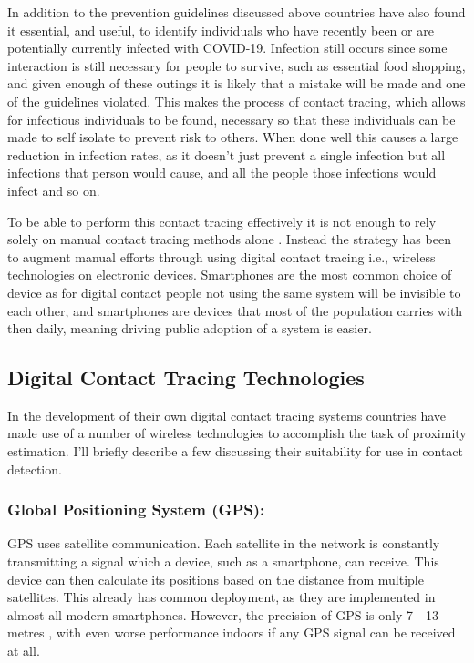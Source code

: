 \documentclass{l4proj}
\begin{document}
In addition to the prevention guidelines discussed above countries have also found it essential, and useful, to identify individuals who have recently been or are potentially currently infected with COVID-19. Infection still occurs since some interaction is still necessary for people to survive, such as essential food shopping, and given enough of these outings it is likely that a mistake will be made and one of the guidelines violated. This makes the process of contact tracing, which allows for infectious individuals to be found, necessary so that these individuals can be made to self isolate to prevent risk to others. When done well this causes a large reduction in infection rates, as it doesn't just prevent a single infection but all infections that person would cause, and all the people those infections would infect and so on.

To be able to perform this contact tracing effectively it is not enough to rely solely on manual contact tracing methods alone \citep{shubina_technical_2020}. Instead the strategy has been to augment manual efforts through using digital contact tracing i.e., wireless technologies on electronic devices. Smartphones are the most common choice of device as for digital contact people not using the same system will be invisible to each other, and smartphones are devices that most of the population carries with then daily, meaning driving public adoption of a system is easier.

\subsection{Digital Contact Tracing Technologies}

In the development of their own digital contact tracing systems countries have made use of a number of wireless technologies to accomplish the task of proximity estimation. I'll briefly describe a few discussing their suitability for use in contact detection.

\subsubsection{Global Positioning System (GPS):}

GPS uses satellite communication. Each satellite in the network is constantly transmitting a signal which a device, such as a smartphone, can receive. This device can then calculate its positions based on the distance from multiple satellites. This already has common deployment, as they are implemented in almost all modern smartphones. However, the precision of GPS is only 7 - 13 metres \citep{merry_smartphone_2019}, with even worse performance indoors if any GPS signal can be received at all.
\end{document}
